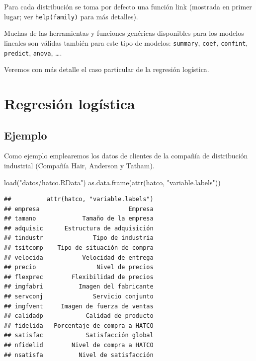 \documentclass[
]{book}
\newenvironment{Shaded}{\begin{snugshade}}{\end{snugshade}}
\newcommand{\FunctionTok}[1]{\textcolor[rgb]{0.00,0.00,0.00}{#1}}
\newcommand{\NormalTok}[1]{#1}
\newcommand{\StringTok}[1]{\textcolor[rgb]{0.31,0.60,0.02}{#1}}
\theoremstyle{break}
\begin{document}
Para cada distribución se toma por defecto una función link (mostrada en primer lugar; ver \texttt{help(family)} para más detalles).

Muchas de las herramientas y funciones genéricas disponibles para los modelos lineales son válidas
también para este tipo de modelos: \texttt{summary}, \texttt{coef}, \texttt{confint}, \texttt{predict}, \texttt{anova}, \ldots.

Veremos con más detalle el caso particular de la regresión logística.

\hypertarget{regresiuxf3n-loguxedstica}{%
\section{Regresión logística}\label{regresiuxf3n-loguxedstica}}

\hypertarget{ejemplo-2}{%
\subsection{Ejemplo}\label{ejemplo-2}}

Como ejemplo emplearemos los datos de clientes de la compañía de distribución industrial (Compañía Hair, Anderson y Tatham).

\begin{Shaded}
\begin{Highlighting}[]
\FunctionTok{load}\NormalTok{(}\StringTok{"datos/hatco.RData"}\NormalTok{)}
\FunctionTok{as.data.frame}\NormalTok{(}\FunctionTok{attr}\NormalTok{(hatco, }\StringTok{"variable.labels"}\NormalTok{))}
\end{Highlighting}
\end{Shaded}

\begin{verbatim}
##          attr(hatco, "variable.labels")
## empresa                         Empresa
## tamano             Tamaño de la empresa
## adquisic      Estructura de adquisición
## tindustr              Tipo de industria
## tsitcomp    Tipo de situación de compra
## velocida           Velocidad de entrega
## precio                 Nivel de precios
## flexprec        Flexibilidad de precios
## imgfabri          Imagen del fabricante
## servconj              Servicio conjunto
## imgfvent     Imagen de fuerza de ventas
## calidadp            Calidad de producto
## fidelida   Porcentaje de compra a HATCO
## satisfac            Satisfacción global
## nfidelid        Nivel de compra a HATCO
## nsatisfa          Nivel de satisfacción
\end{verbatim}
\end{document}
